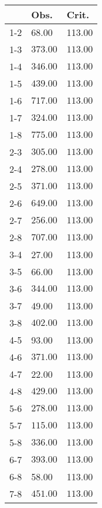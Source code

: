 \begin{table}[ht]
\centering
\begin{tabular}{rll}
  \hline
 & Obs. & Crit. \\ 
  \hline
1-2 & 68.00 & 113.00 \\ 
  1-3 & \(\mathbf{373.00}\) & \(\mathbf{113.00}\) \\ 
  1-4 & \(\mathbf{346.00}\) & \(\mathbf{113.00}\) \\ 
  1-5 & \(\mathbf{439.00}\) & \(\mathbf{113.00}\) \\ 
  1-6 & \(\mathbf{717.00}\) & \(\mathbf{113.00}\) \\ 
  1-7 & \(\mathbf{324.00}\) & \(\mathbf{113.00}\) \\ 
  1-8 & \(\mathbf{775.00}\) & \(\mathbf{113.00}\) \\ 
  2-3 & \(\mathbf{305.00}\) & \(\mathbf{113.00}\) \\ 
  2-4 & \(\mathbf{278.00}\) & \(\mathbf{113.00}\) \\ 
  2-5 & \(\mathbf{371.00}\) & \(\mathbf{113.00}\) \\ 
  2-6 & \(\mathbf{649.00}\) & \(\mathbf{113.00}\) \\ 
  2-7 & \(\mathbf{256.00}\) & \(\mathbf{113.00}\) \\ 
  2-8 & \(\mathbf{707.00}\) & \(\mathbf{113.00}\) \\ 
  3-4 & 27.00 & 113.00 \\ 
  3-5 & 66.00 & 113.00 \\ 
  3-6 & \(\mathbf{344.00}\) & \(\mathbf{113.00}\) \\ 
  3-7 & 49.00 & 113.00 \\ 
  3-8 & \(\mathbf{402.00}\) & \(\mathbf{113.00}\) \\ 
  4-5 & 93.00 & 113.00 \\ 
  4-6 & \(\mathbf{371.00}\) & \(\mathbf{113.00}\) \\ 
  4-7 & 22.00 & 113.00 \\ 
  4-8 & \(\mathbf{429.00}\) & \(\mathbf{113.00}\) \\ 
  5-6 & \(\mathbf{278.00}\) & \(\mathbf{113.00}\) \\ 
  5-7 & \(\mathbf{115.00}\) & \(\mathbf{113.00}\) \\ 
  5-8 & \(\mathbf{336.00}\) & \(\mathbf{113.00}\) \\ 
  6-7 & \(\mathbf{393.00}\) & \(\mathbf{113.00}\) \\ 
  6-8 & 58.00 & 113.00 \\ 
  7-8 & \(\mathbf{451.00}\) & \(\mathbf{113.00}\) \\ 
   \hline
\end{tabular}
\end{table}
